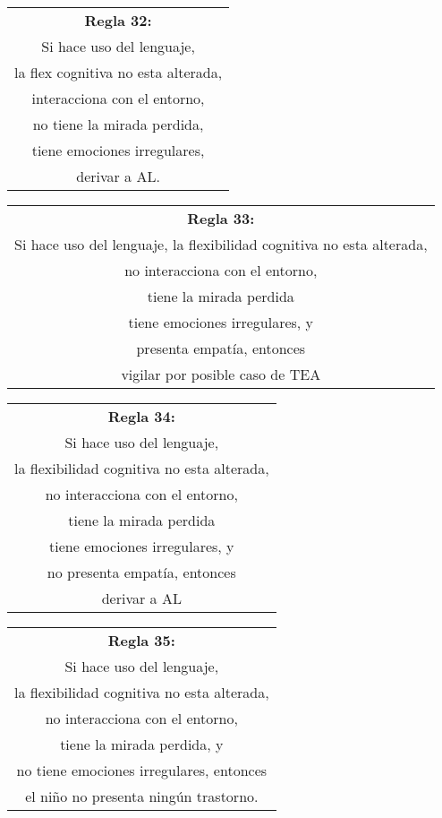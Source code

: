 \documentclass[letterpaper,12pt]{article}
\begin{document}
\begin{center}
	\begin{tabular}{|c|}
		\hline 
		\textbf{Regla 32:} \\
Si hace uso del lenguaje,\\
la flex cognitiva no esta alterada,\\
interacciona con el entorno,\\
no tiene la mirada perdida,\\
tiene emociones irregulares,\\
derivar a AL.\\
\hline 
\end{tabular} 
\end{center}
	
\begin{center}
	\begin{tabular}{|c|}
		\hline 
		\textbf{Regla 33:} \\
Si hace uso del lenguaje,
la flexibilidad cognitiva no esta alterada,\\
no interacciona con el entorno,\\
tiene la mirada perdida\\
tiene emociones irregulares, y\\
presenta empatía, entonces\\
vigilar por posible caso de TEA\\
\hline 
\end{tabular} 
\end{center}

\begin{center}
	\begin{tabular}{|c|}
		\hline 
		\textbf{Regla 34:} \\
		Si hace uso del lenguaje,\\
		la flexibilidad cognitiva no esta alterada,\\
		no interacciona con el entorno,\\
		tiene la mirada perdida\\
		tiene emociones irregulares, y\\
		no presenta empatía, entonces\\
		derivar a AL\\
\hline 
\end{tabular} 
\end{center}
		
\begin{center}
	\begin{tabular}{|c|}
		\hline 
		\textbf{Regla 35:} \\
		Si hace uso del lenguaje,\\
		la flexibilidad cognitiva no esta alterada,\\
		no interacciona con el entorno,\\
		tiene la mirada perdida, y\\
		no tiene emociones irregulares, entonces\\
		el niño no presenta ningún trastorno.\\
\hline 
\end{tabular} 
\end{center}
		
\end{document}
